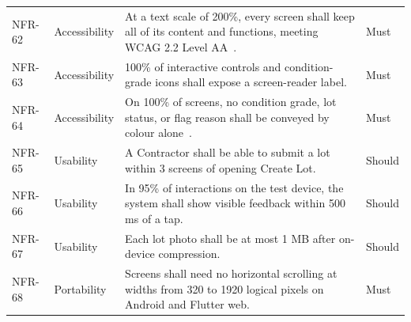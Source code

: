 {\begin{longtable}{@{}p{}p{}p{}p{}@{}}
NFR-62 & Accessibility & At a text scale of 200\%, every screen shall keep all of its content and functions, meeting WCAG 2.2 Level AA~\citep{wcag22}. & Must \\
NFR-63 & Accessibility & 100\% of interactive controls and condition-grade icons shall expose a screen-reader label. & Must \\
NFR-64 & Accessibility & On 100\% of screens, no condition grade, lot status, or flag reason shall be conveyed by colour alone~\citep{wcag22}. & Must \\
NFR-65 & Usability & A Contractor shall be able to submit a lot within 3 screens of opening Create Lot. & Should \\
NFR-66 & Usability & In 95\% of interactions on the test device, the system shall show visible feedback within 500 ms of a tap. & Should \\
NFR-67 & Usability & Each lot photo shall be at most 1 MB after on-device compression. & Should \\
NFR-68 & Portability & Screens shall need no horizontal scrolling at widths from 320 to 1920 logical pixels on Android and Flutter web. & Must \\
\bottomrule
\end{longtable}
}

